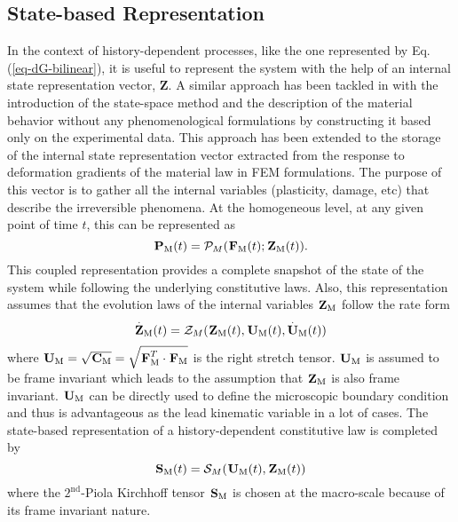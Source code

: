 \subsection{State-based Representation}\label{nn-dnn-state}
In the context of history-dependent processes, like the one represented by Eq. (\ref{eq-dG-bilinear}), it is useful to represent the system with the help of an internal state representation vector, $ \textbf{Z} $\cite{rezguiPredictiveElastoplasticDamage2016}. A similar approach has been tackled in \cite{furukawaImplicitConstitutiveModelling1998} with the introduction of the state-space method and the description of the material behavior without any phenomenological formulations by constructing it based only on the experimental data. This approach has been extended to the storage of the internal state representation vector extracted from the response to deformation gradients of the material law in FEM formulations. The purpose of this vector is to gather all the internal variables (plasticity, damage, etc) that describe the irreversible phenomena. At the homogeneous level, at any given point of time $ t $, this can be represented as
\begin{equation}\label{eq-ch-state1}
\tgm[]{P}(t)=\mathcal{P}_M(\tgm[]{F}(t);\tgm[]{Z}(t)).
\end{equation}
This coupled representation provides a complete snapshot of the state of the system while following the underlying constitutive laws. Also, this representation assumes that the evolution laws of the internal variables $ \tgm[]{Z} $ follow the rate form
\begin{equation}\label{eq-ch-state2}
\overset{.}{\textbf{Z}}_\text{M}(t)=\mathcal{Z}_M(\tgm[]{Z}(t),\tgm[]{U}(t),\overset{.}{\textbf{U}}_\text{M}(t))
\end{equation}
where $ \tgm[]{U}=\sqrt{\tgm[]{C}}=\sqrt{\tgm[]{F}^T\cdot\tgm[]{F}} $ is the right stretch tensor. $ \tgm[]{U} $ is assumed to be frame invariant which leads to the assumption that $ \tgm[]{Z}$ is also frame invariant. $  \tgm[]{U} $ can be directly used to define the microscopic boundary condition and thus is advantageous as the lead kinematic variable in a lot of cases. The state-based representation of a history-dependent constitutive law is completed by
\begin{equation}\label{eq-ch-state3}
\tgm[]{S}(t)=\mathcal{S}_M(\tgm[]{U}(t),\tgm[]{Z}(t))
\end{equation}
where the  $ 2^\text{nd} $-Piola Kirchhoff tensor $ \tgm[]{S} $ is chosen at the macro-scale because of its frame invariant nature. 

